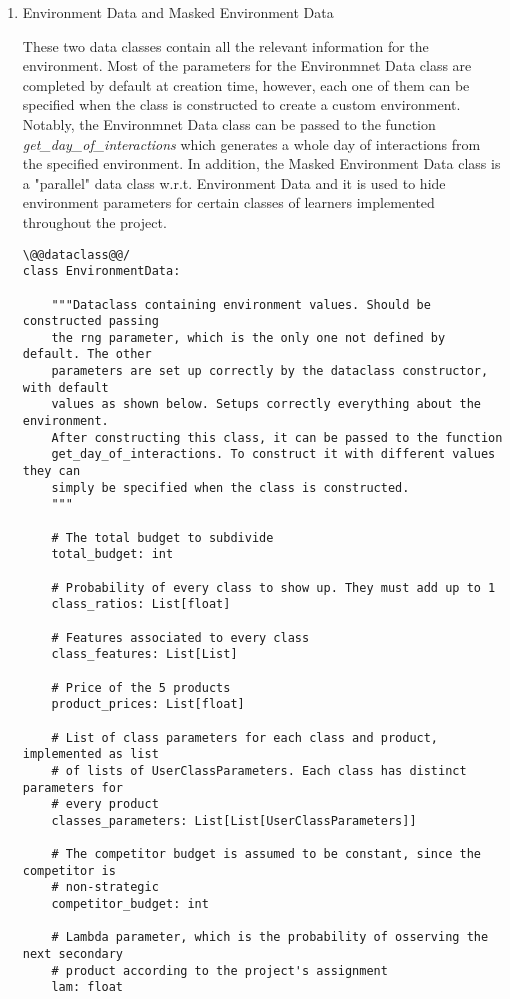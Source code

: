         \begin{enumerate}
            \item Environment Data and Masked Environment Data

            These two data classes contain all the relevant information for the environment. Most of the parameters for the Environmnet Data class are completed by default at creation time, however, each one of them can be specified when the class is constructed to create a custom environment. Notably, the Environmnet Data class can be passed to the function \textit{get\_day\_of\_interactions} which generates a whole day of interactions from the specified environment. In addition, the Masked Environment Data class is a "parallel" data class w.r.t. Environment Data and it is used to hide environment parameters for certain classes of learners implemented throughout the project.

            \begin{lstlisting}[style=Python]
\@@dataclass@@/
class EnvironmentData:

    """Dataclass containing environment values. Should be constructed passing
    the rng parameter, which is the only one not defined by default. The other
    parameters are set up correctly by the dataclass constructor, with default
    values as shown below. Setups correctly everything about the environment.
    After constructing this class, it can be passed to the function
    get_day_of_interactions. To construct it with different values they can
    simply be specified when the class is constructed.
    """

    # The total budget to subdivide
    total_budget: int

    # Probability of every class to show up. They must add up to 1
    class_ratios: List[float]

    # Features associated to every class
    class_features: List[List]

    # Price of the 5 products
    product_prices: List[float]

    # List of class parameters for each class and product, implemented as list
    # of lists of UserClassParameters. Each class has distinct parameters for
    # every product
    classes_parameters: List[List[UserClassParameters]]

    # The competitor budget is assumed to be constant, since the competitor is
    # non-strategic
    competitor_budget: int

    # Lambda parameter, which is the probability of osserving the next secondary
    # product according to the project's assignment
    lam: float


\end{lstlisting}
\end{enumerate}

